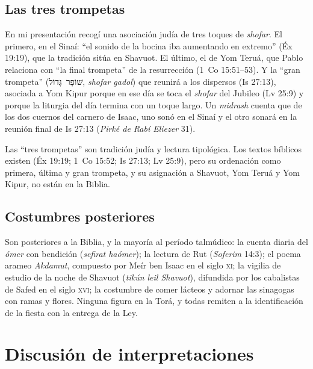 \documentclass[11pt,letterpaper]{article}
\newcommand{\heb}[1]{\mbox{\foreignlanguage{hebrew}{#1}}}
\begin{document}
\subsection{Las tres trompetas}

En mi presentación recogí una asociación judía de tres toques de \emph{shofar}. El primero, en el Sinaí: ``el sonido de la bocina iba aumentando en extremo'' (Éx 19:19), que la tradición sitúa en Shavuot. El último, el de Yom Teruá, que Pablo relaciona con ``la final trompeta'' de la resurrección (1~Co 15:51--53). Y la ``gran trompeta'' (\heb{שׁוֹפָר גָּדוֹל}, \emph{shofar gadol}) que reunirá a los dispersos (Is 27:13), asociada a Yom Kipur porque en ese día se toca el \emph{shofar} del Jubileo (Lv 25:9) y porque la liturgia del día termina con un toque largo. Un \emph{midrash} cuenta que de los dos cuernos del carnero de Isaac, uno sonó en el Sinaí y el otro sonará en la reunión final de Is 27:13 (\emph{Pirké de Rabí Eliezer} 31).

\begin{nota}[Precisión]
Las ``tres trompetas'' son tradición judía y lectura tipológica. Los textos bíblicos existen (Éx 19:19; 1~Co 15:52; Is 27:13; Lv 25:9), pero su ordenación como primera, última y gran trompeta, y su asignación a Shavuot, Yom Teruá y Yom Kipur, no están en la Biblia.
\end{nota}

\subsection{Costumbres posteriores}

\begin{nota}
Son posteriores a la Biblia, y la mayoría al período talmúdico: la cuenta diaria del \emph{ómer} con bendición (\emph{sefirat haómer}); la lectura de Rut (\emph{Soferim} 14:3); el poema arameo \emph{Akdamut}, compuesto por Meír ben Isaac en el siglo \textsc{xi}; la vigilia de estudio de la noche de Shavuot (\emph{tikún leil Shavuot}), difundida por los cabalistas de Safed en el siglo \textsc{xvi}; la costumbre de comer lácteos y adornar las sinagogas con ramas y flores. Ninguna figura en la Torá, y todas remiten a la identificación de la fiesta con la entrega de la Ley.
\end{nota}

\section{Discusión de interpretaciones}
\end{document}
